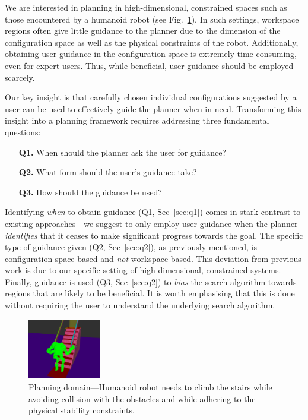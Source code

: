\documentclass[conference]{IEEEtran}
\begin{document}
We are interested in planning in high-dimensional, constrained spaces such as those encountered by a humanoid robot (see Fig.~\ref{fig:robot}).
In such settings, workspace regions often give little guidance to the planner due to the dimension of the configuration space as well as the physical constraints of the robot.
Additionally, obtaining user guidance in the configuration space is extremely time consuming, even for expert users.
Thus,  while beneficial, user guidance should be employed scarcely.

Our key insight is that carefully chosen individual configurations suggested by a user can be used to effectively guide the planner when in need.
Transforming this insight into a planning framework requires addressing three fundamental questions:

\begin{itemize}
	\item[\textbf{Q1.}] When should the planner ask the user for guidance?
	\item[\textbf{Q2.}] What form should the user's guidance take?
	\item[\textbf{Q3.}] How should the guidance be used?
\end{itemize}

Identifying \emph{when} to obtain guidance 
(Q1, Sec~\ref{sec:q1}) 
comes in stark contrast to existing approaches---we suggest to only employ user guidance when the planner \emph{identifies} that it ceases to make significant progress towards the goal.
The specific type of guidance given 
(Q2, Sec~\ref{sec:q2}),
as previously mentioned,
is configuration-space based and \emph{not} workspace-based. This deviation from previous work is due to our specific setting of high-dimensional, constrained systems.
Finally, guidance is used 
(Q3, Sec~\ref{sec:q2})
to \emph{bias} the search algorithm towards regions that are likely to be beneficial. 
It is worth emphasising that this is done without requiring the user to understand the underlying search algorithm. 

% 

\begin{figure}[tb]
  \centering
  	\includegraphics[width=0.283\textwidth]{fig/workspace.png}
  	\vspace{-2mm}
  \caption{
		Planning domain---Humanoid robot needs to climb the stairs while avoiding collision with the obstacles and while adhering to the physical stability constraints.
  	}
   	\label{fig:robot}
\end{figure}
\end{document}
